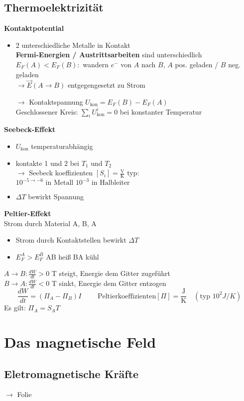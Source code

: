 \documentclass[titlepage,12pt,a4paper,ngerman]{report}
\newcommand{\tx}[1]{\textrm{#1}}
\begin{document}
\subsection{Thermoelektrizität}
\textbf{Kontaktpotential}
\begin{itemize}
	\item 2 unterschiedliche Metalle in Kontakt\\
	\textbf{Fermi-Energien / Austrittsarbeiten} sind unterschiedlich\\
	$ E_F(A) < E_F(B) : $ wandern $ e^- $ von $ A $ nach $ B $, $ A $ pos. geladen / $ B $ neg. geladen \\
	$ \rightarrow \vec{E}(A\rightarrow B) $ entgegengesetzt zu Strom
	\item[$ \rightarrow $] Kontaktspannung $ U_{\tx{kon}} = E_F(B)-E_F(A) $\\
	Geschlossener Kreis: $ \sum_i U_{\tx{kon}}^i = 0 $ bei konstanter Temperatur
\end{itemize}
\textbf{Seebeck-Effekt}
\begin{itemize}
	\item $ U_{\tx{kon}} $ temperaturabhängig
	\item kontakte 1 und 2 bei $ T_1 $ und $ T_2 $\\
	$ \rightarrow $ Seebeck koeffizienten $ [S_i]  = \frac{\tx{V}}{\tx{K}}$ typ: $ 10^{-5 \rightarrow -6} \tx{ in Metall } 10^{-3} \tx{ in Halbleiter } $
	\item $ \Delta T $ bewirkt Spannung
\end{itemize}
\textbf{Peltier-Effekt}\\
Strom durch Material A, B, A
\begin{itemize}
	\item Strom durch Kontaktstellen bewirkt $ \Delta T $
	\item $ E^A_F > E_F^B $ AB heiß BA kühl
\end{itemize}
$ A\rightarrow B : \frac{dW}{dt} > 0$ T steigt, Energie dem Gitter zugeführt\\[5pt]
$ B\rightarrow A : \frac{dW}{dt} < 0$ T sinkt, Energie dem Gitter entzogen
$$\frac{dW}{dt} = (\Pi_A - \Pi_B)I \qquad  \tx{ Peltierkoeffizienten} [\Pi] = \frac{\tx{J}}{\tx{K}} \quad (\tx{typ } 10^2 J/K)$$
Es gilt: $ \Pi_A = S_A T$

\section{Das magnetische Feld}
\subsection{Eletromagnetische Kräfte}
 $ \rightarrow $ Folie
\end{document}
